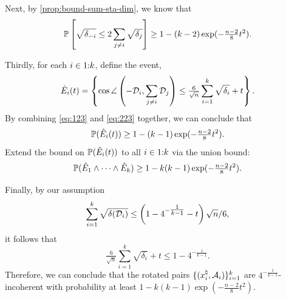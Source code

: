 Next, by \autoref{prop:bound-sum-sta-dim}, we know that 
\begin{equation}\label{eq:223}
  \mathbb{P}\left[ \sqrt{\delta_{-i}} \leq 2\sum_{j\neq i} \sqrt{\delta_j}\right] \geq 1 - (k-2)\exp(-\tfrac{n-2}{8}t^2).
\end{equation}


Thirdly, for each $i\in1\mathord{:}k$, define the event, 
\[
\hat E_i(t) =  \left \{ \cos\angle\left(-\mathcal{D}_i, \sum_{j \neq i}\mathcal{D}_j\right) \leq \tfrac{6}{\sqrt{n}}\sum_{i=1}^k\sqrt{\delta_i} + t\right \}.
\]
By combining \eqref{eq:123} and \eqref{eq:223} together, we can conclude that 
\[\mathbb{P}(\hat E_i(t)) \geq 1 - (k-1)\exp(-\tfrac{n-2}{8}t^2).\]
Extend the bound on $\mathbb{P}(\hat E_i(t))$ to all $i\in1\mathord{:}k$ via the union bound:
\[\mathbb{P}(\hat E_1\land\cdots\land \hat E_k) \geq 1 - k(k-1)\exp(-\tfrac{n-2}{8}t^2).\]

Finally, by our assumption
\[\sum_{i=1}^k \sqrt{\delta(\mathcal{D}_i)} \leq \left(1 - 4^{- \tfrac{1}{k-1} } - t\right)\sqrt{n} / 6,\] it follows that 
\[\tfrac{6}{\sqrt{n}}\sum_{i=1}^k\sqrt{\delta_i} + t \leq 1 - 4^{- \tfrac{1}{k-1} }.\]
Therefore, we can conclude that the rotated pairs $\{(x_i^{\natural},\mathcal{A}_i)\}_{i=1}^k$ are $4^{- \tfrac{1}{k-1} }$-incoherent with probability at least $1 - k(k-1)\exp(-\tfrac{n-2}{8}t^2)$.










